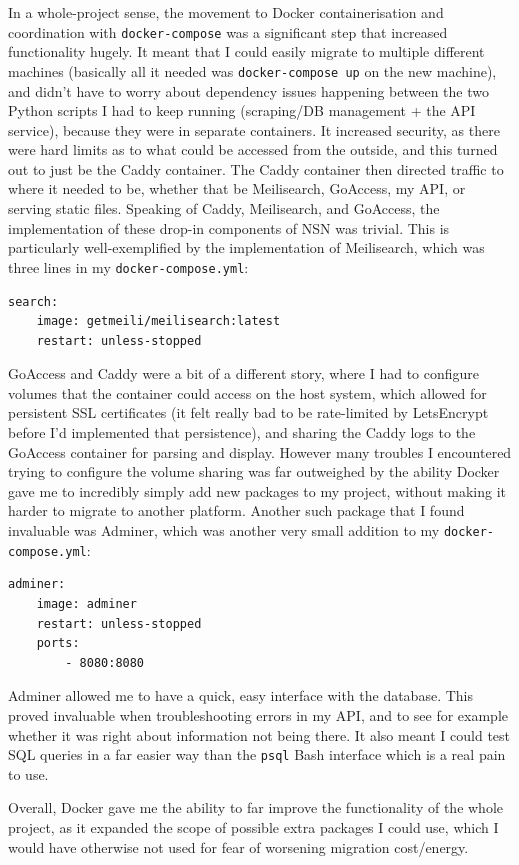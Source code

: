 \documentclass{article}
\begin{document}
In a whole-project sense, the movement to Docker containerisation and coordination with \texttt{docker-compose} was a significant step that increased functionality hugely. It meant that I could easily migrate to multiple different machines (basically all it needed was \texttt{docker-compose up} on the new machine), and didn't have to worry about dependency issues happening between the two Python scripts I had to keep running (scraping/DB management + the API service), because they were in separate containers. It increased security, as there were hard limits as to what could be accessed from the outside, and this turned out to just be the Caddy container. The Caddy container then directed traffic to where it needed to be, whether that be Meilisearch, GoAccess, my API, or serving static files. Speaking of Caddy, Meilisearch, and GoAccess, the implementation of these drop-in components of NSN was trivial. This is particularly well-exemplified by the implementation of Meilisearch, which was three lines in my \texttt{docker-compose.yml}:
\begin{verbatim}
search:
    image: getmeili/meilisearch:latest
    restart: unless-stopped
\end{verbatim}
GoAccess and Caddy were a bit of a different story, where I had to configure volumes that the container could access on the host system, which allowed for persistent SSL certificates (it felt really bad to be rate-limited by LetsEncrypt before I'd implemented that persistence), and sharing the Caddy logs to the GoAccess container for parsing and display. However many troubles I encountered trying to configure the volume sharing was far outweighed by the ability Docker gave me to incredibly simply add new packages to my project, without making it harder to migrate to another platform. Another such package that I found invaluable was Adminer, which was another very small addition to my \texttt{docker-compose.yml}:
\begin{verbatim}
adminer:
    image: adminer
    restart: unless-stopped
    ports:
        - 8080:8080
\end{verbatim}
Adminer allowed me to have a quick, easy interface with the database. This proved invaluable when troubleshooting errors in my API, and to see for example whether it was right about information not being there. It also meant I could test SQL queries in a far easier way than the \texttt{psql} Bash interface which is a real pain to use.

Overall, Docker gave me the ability to far improve the functionality of the whole project, as it expanded the scope of possible extra packages I could use, which I would have otherwise not used for fear of worsening migration cost/energy.
\end{document}
